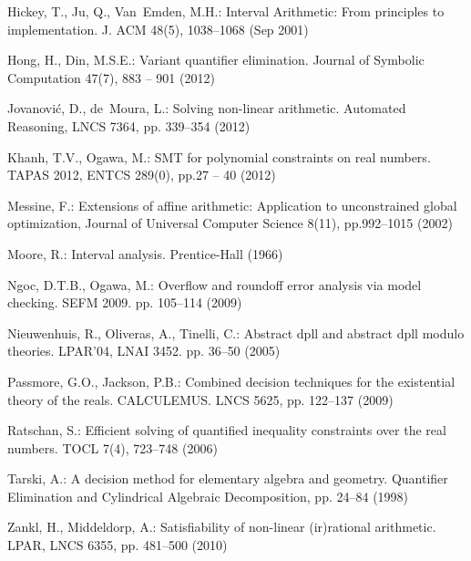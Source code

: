 \documentclass[runningheads,a4paper,oribibl]{llncs}
\begin{document}
\begin{thebibliography}{10}
Hickey, T., Ju, Q., Van~Emden, M.H.: Interval Arithmetic: From principles to
  implementation. J. ACM  48(5),  1038--1068 (Sep 2001)

Hong, H., Din, M.S.E.: Variant quantifier elimination. Journal of Symbolic
  Computation  47(7),  883 -- 901 (2012) %

  Jovanović, D., de~Moura, L.: Solving non-linear arithmetic. Automated Reasoning,
  LNCS 7364, pp. 339--354 (2012)

Khanh, T.V., Ogawa, M.: SMT for polynomial constraints on real numbers.
 TAPAS 2012, ENTCS 289(0), pp.27 -- 40 (2012) 


Messine, F.: Extensions of affine arithmetic: Application to unconstrained
global optimization, Journal of Universal Computer Science 8(11),
pp.992--1015 (2002)

Moore, R.: Interval analysis. %
  Prentice-Hall (1966)

Ngoc, D.T.B., Ogawa, M.: Overflow and roundoff error analysis via model
  checking. SEFM 2009. pp. 105--114 (2009)

Nieuwenhuis, R., Oliveras, A., Tinelli, C.: Abstract dpll and abstract dpll
  modulo theories. LPAR’04, LNAI 3452. pp. 36--50 (2005)

Passmore, G.O., Jackson, P.B.: Combined decision techniques for the existential
  theory of the reals. CALCULEMUS. LNCS 5625, pp. 122--137 (2009)

Ratschan, S.: Efficient solving of quantified inequality constraints over the
  real numbers. TOCL  7(4),  723--748 (2006)



Tarski, A.: A decision method for elementary algebra and geometry.
  Quantifier Elimination and Cylindrical Algebraic Decomposition, pp. 24--84 (1998)

Zankl, H., Middeldorp, A.: Satisfiability of non-linear (ir)rational
  arithmetic. LPAR, LNCS 6355, pp. 481--500 (2010)

\end{thebibliography}
\end{document}
